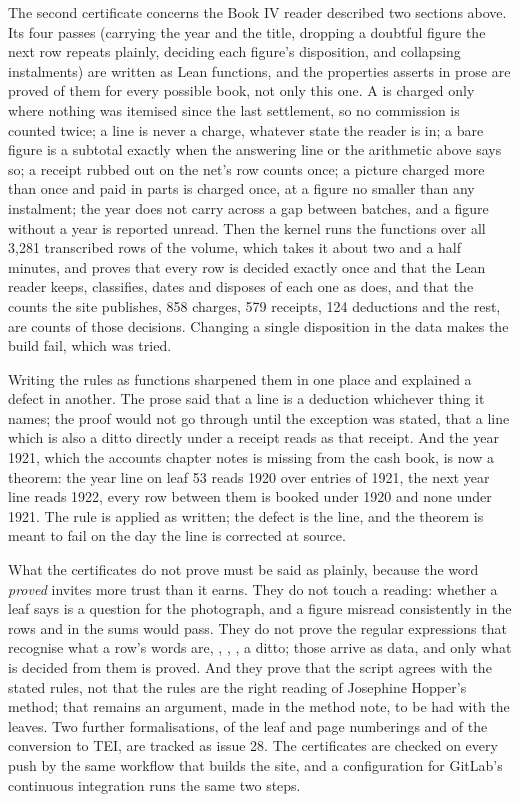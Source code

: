The second certificate concerns the Book IV reader described two sections above. Its four passes (carrying the year and the title, dropping a doubtful figure the next row repeats plainly, deciding each figure's disposition, and collapsing instalments) are written as Lean functions, and the properties  asserts in prose are proved of them for every possible book, not only this one. A  is charged only where nothing was itemised since the last settlement, so no commission is counted twice; a  line is never a charge, whatever state the reader is in; a bare figure is a subtotal exactly when the answering line or the arithmetic above says so; a receipt rubbed out on the net's row counts once; a picture charged more than once and paid in parts is charged once, at a figure no smaller than any instalment; the year does not carry across a gap between batches, and a figure without a year is reported unread. Then the kernel runs the functions over all 3,281 transcribed rows of the volume, which takes it about two and a half minutes, and proves that every row is decided exactly once and that the Lean reader keeps, classifies, dates and disposes of each one as  does, and that the counts the site publishes, 858 charges, 579 receipts, 124 deductions and the rest, are counts of those decisions. Changing a single disposition in the data makes the build fail, which was tried.

Writing the rules as functions sharpened them in one place and explained a defect in another. The prose said that a  line is a deduction whichever thing it names; the proof would not go through until the exception was stated, that a  line which is also a ditto directly under a receipt reads as that receipt. And the year 1921, which the accounts chapter notes is missing from the cash book, is now a theorem: the year line on leaf 53 reads 1920 over entries of 1921, the next year line reads 1922, every row between them is booked under 1920 and none under 1921. The rule is applied as written; the defect is the line, and the theorem is meant to fail on the day the line is corrected at source.

What the certificates do not prove must be said as plainly, because the word \emph{proved} invites more trust than it earns. They do not touch a reading: whether a leaf says  is a question for the photograph, and a figure misread consistently in the rows and in the sums would pass. They do not prove the regular expressions that recognise what a row's words are, , , , a ditto; those arrive as data, and only what is decided from them is proved. And they prove that the script agrees with the stated rules, not that the rules are the right reading of Josephine Hopper's method; that remains an argument, made in the method note, to be had with the leaves. Two further formalisations, of the leaf and page numberings and of the conversion to TEI, are tracked as issue 28. The certificates are checked on every push by the same workflow that builds the site, and a configuration for GitLab's continuous integration runs the same two steps.

